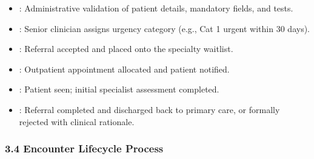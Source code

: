 \begin{itemize}
\begin{itemize}
\item
\texttt{}: Administrative validation of patient details, mandatory fields, and tests.



\item
\texttt{}: Senior clinician assigns urgency category (e.g., Cat 1 urgent within 30 days).



\item
\texttt{}: Referral accepted and placed onto the specialty waitlist.



\item
\texttt{}: Outpatient appointment allocated and patient notified.



\item
\texttt{}: Patient seen; initial specialist assessment completed.



\item
\texttt{}: Referral completed and discharged back to primary care, or formally rejected with clinical rationale.



\end{itemize}


\end{itemize}
\label{rad:processes:117}

\par\smallskip
{}\label{rad:processes:119}
\subsubsection*{3.4 Encounter Lifecycle Process}
\label{rad:processes:120}

